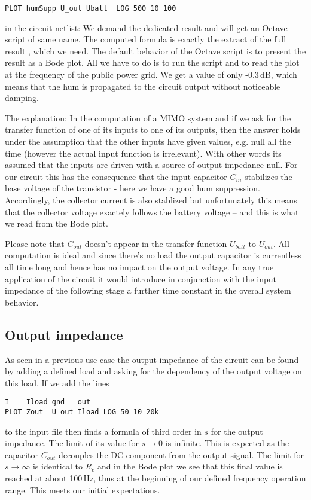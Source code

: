\verb+PLOT humSupp U_out Ubatt  LOG 500 10 100+

in the circuit netlist: We demand the dedicated result  and
will get an Octave script of same name. The computed formula is exactly
the extract of the full result , which we need. The default
behavior of the Octave script is to present the result as
a Bode plot. All we have to do is to run the script and to read the plot
at the frequency of the public power grid. We get a value of only
-0.3\,dB, which means that the hum is propagated to the circuit output
without noticeable damping.

The explanation: In the computation of a MIMO system and if we ask for the
transfer function of one of its inputs to one of its outputs, then the
answer holds under the assumption that the other inputs have given values,
e.g. null all the time (however the actual input function is irrelevant).
With other words its assumed that the inputs are driven with a source of
output impedance null. For our circuit this has the consequence that the
input capacitor $C_{in}$ stabilizes the base voltage of the transistor -
here we have a good hum suppression. Accordingly, the collector current is
also stablized but unfortunately this means that the collector voltage
exactely follows the battery voltage -- and this is what we read from the
Bode plot.

Please note that $C_{out}$ doesn't appear in the transfer function
$U_{batt}$ to $U_{out}$. All computation is ideal and since there's no
load the output capacitor is currentless all time long and hence has no
impact on the output voltage. In any true application of the circuit it
would introduce in conjunction with the input impedance of the following
stage a further time constant in the overall system behavior.


\subsection{Output impedance}

As seen in a previous use case the output impedance of the circuit can be
found by adding a defined load and asking for the dependency of the output
voltage on this load. If we add the lines
\begin{verbatim}
I    Iload gnd   out   
PLOT Zout  U_out Iload LOG 50 10 20k
\end{verbatim}
to the input file then \linnet{} finds a formula of third order in $s$ for
the output impedance. The limit of its value for $s \to 0$ is infinite.
This is expected as the capacitor $C_{out}$ decouples the DC component
from the output signal. The limit for $s \to \infty$ is identical to $R_c$
and in the Bode plot we see that this final value is reached at about
100\,Hz, thus at the beginning of our defined frequency operation range.
This meets our initial expectations.

